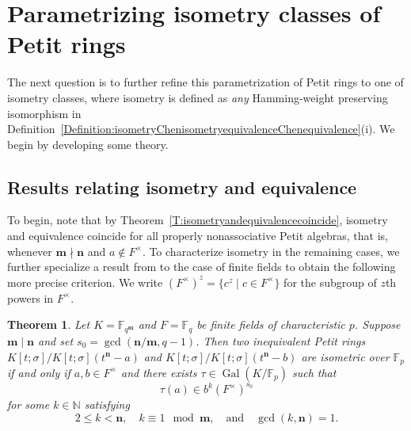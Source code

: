 \documentclass[11pt]{amsart}
\theoremstyle{plain}
\newtheorem{theorem}{Theorem}[section]
\theoremstyle{definition}
\numberwithin{equation}{section}
\numberwithin{figure}{section}
\newcommand{\NN}{\mathbb{N}}
\newcommand{\FF}{\mathbb{F}}
\newcommand{\os}{{\mathbf{m}}}  %
\newcommand{\de}{{\mathbf{n}}}  %
\DeclareMathOperator{\Gal}{Gal}
\begin{document}
\section{Parametrizing isometry classes of Petit rings}\label{sec:isoclasses}

The next question is to further refine this parametrization of Petit rings to one of isometry classes, where isometry is defined as \emph{any} Hamming-weight preserving isomorphism in Definition~\ref{Definition:isometryChenisometryequivalenceChenequivalence}(i).   We begin by developing some theory.




\subsection{Results relating isometry and equivalence}\label{SS:theoremsforisometry}
To begin, note that by Theorem~\ref{T:isometryandequivalencecoincide}, isometry and equivalence coincide for all properly nonassociative Petit algebras, that is, whenever $\os\nmid \de$ and $a \notin F^\times$.  To characterize isometry in the remaining cases, we further specialize a result from \cite{NevinsPumpluen2025submitted} to the case of finite fields to obtain the following more precise criterion.  We write $(F^\times)^z = \{c^z\mid c\in F^\times\}$ for the subgroup of $z$th powers in $F^\times$.

\begin{theorem}\label{T:isometrydifferentfromequivalence}
Let $K=\FF_{q^\os}$ and $F=\FF_q$ be finite fields of characteristic $p$.
Suppose $\os\mid\de$ and set $s_0=\gcd(\de/\os,q-1)$.  Then two \emph{inequivalent} Petit rings $K[t;\sigma]/K[t;\sigma](t^\de-a)$ and $K[t;\sigma]/K[t;\sigma](t^\de-b)$ are isometric over $\FF_p$  if and only if
     $a,b\in F^\times$ and
there exists $\tau \in \Gal(K/\FF_p)$ such that $$\tau(a)\in b^k (F^\times)^{s_0}$$
for some $k\in \NN$ satisfying
\begin{equation}\label{E:conditionsonk}
2\leq k <\de, \quad k\equiv 1 \mod \os, \quad \text{and} \quad \gcd(k,\de)=1.
\end{equation}
\end{theorem}
\end{document}
